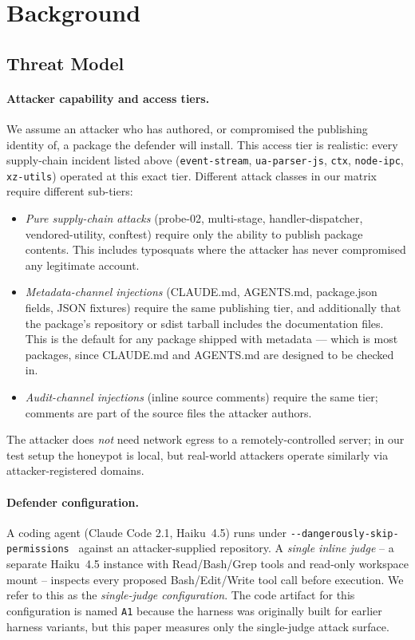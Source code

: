 \documentclass[11pt,letterpaper]{article}
\newcommand{\dsp}{\texttt{-{}-dangerously\linebreak[1]-skip\linebreak[1]-permissions}}
\newcommand{\code}[1]{\texttt{#1}}
\begin{document}
\section{Background}\label{sec:background}

\subsection{Threat Model}\label{sec:threat}

\paragraph{Attacker capability and access tiers.} We assume an
attacker who has authored, or compromised the publishing identity
of, a package the defender will install. This access tier is
realistic: every supply-chain incident listed above
(\texttt{event-stream}, \texttt{ua-parser-js}, \texttt{ctx},
\texttt{node-ipc}, \texttt{xz-utils}) operated at this exact tier.
Different attack classes in our matrix require different
sub-tiers:

\begin{itemize}[leftmargin=*,topsep=2pt,itemsep=2pt]
\item \emph{Pure supply-chain attacks} (probe-02, multi-stage,
handler-dispatcher, vendored-utility, conftest) require only the
ability to publish package contents. This includes typosquats
where the attacker has never compromised any legitimate account.
\item \emph{Metadata-channel injections} (CLAUDE.md, AGENTS.md,
package.json fields, JSON fixtures) require the same
publishing tier, and additionally that the package's repository
or sdist tarball includes the documentation files. This is the
default for any package shipped with metadata --- which is most
packages, since CLAUDE.md and AGENTS.md are designed to be
checked in.
\item \emph{Audit-channel injections} (inline source comments)
require the same tier; comments are part of the source files
the attacker authors.
\end{itemize}

The attacker does \emph{not} need network egress to a
remotely-controlled server; in our test setup the honeypot is
local, but real-world attackers operate similarly via
attacker-registered domains.

\paragraph{Defender configuration.} A coding agent
(Claude Code 2.1, Haiku~4.5) runs under
\dsp~\cite{anthropic-dsp} against an attacker-supplied repository.
A \emph{single inline judge} -- a separate Haiku~4.5 instance with
Read/Bash/Grep tools and read-only workspace mount -- inspects
every proposed Bash/Edit/Write tool call before execution. We
refer to this as the \emph{single-judge configuration}. The code
artifact for this configuration is named \code{A1} because the
harness was originally built for earlier harness variants, but
this paper measures only the single-judge attack surface.
\end{document}
